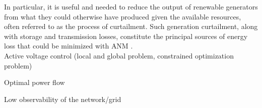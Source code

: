 In particular, it is useful and needed to reduce the output of renewable generators from what they could otherwise have produced given the available resources, often referred to as the process of curtailment. Such generation curtailment, along with storage and transmission losses, constitute the principal sources of energy loss that could be minimized with \gls{ANM} \cite{gym-anm}. \\

Active voltage control (local and global problem, constrained optimization problem)

Optimal power flow

Low observability of the network/grid

